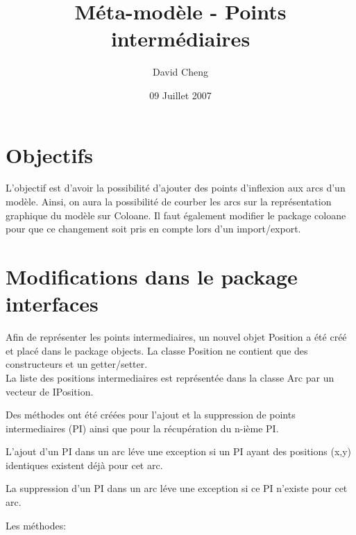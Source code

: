 \documentclass{article}
\title{M\'eta-mod\`ele - Points interm\'ediaires}
\author{David Cheng}
\date{09 Juillet 2007}
\begin{document}
\maketitle

\section{Objectifs}

L'objectif est d'avoir la possibilit\'e d'ajouter des points d'inflexion aux arcs d'un mod\`ele.
Ainsi, on aura la possibilit\'e de courber les arcs sur la repr\'esentation graphique du mod\`ele sur Coloane.
Il faut \'egalement modifier le package coloane pour que ce changement soit pris en compte lors d'un import/export.



\section{Modifications dans le package interfaces}

Afin de repr\'esenter les points intermediaires, un nouvel objet Position a \'et\'e cr\'e\'e et plac\'e dans le package objects.
La classe Position ne contient que des constructeurs et un getter/setter.\\

La liste des positions intermediaires est repr\'esent\'ee dans la classe Arc par un vecteur de IPosition.

Des m\'ethodes ont \'et\'e cr\'e\'ees pour l'ajout et la suppression de points intermediaires (PI) ainsi que pour la r\'ecup\'eration du n-i\`eme PI.

L'ajout d'un PI dans un arc l\'eve une exception si un PI ayant des positions (x,y) identiques existent d\'ej\`a pour cet arc.

La suppression d'un PI dans un arc l\'eve une exception si ce PI n'existe pour cet arc.

Les m\'ethodes: \\
\end{document}
